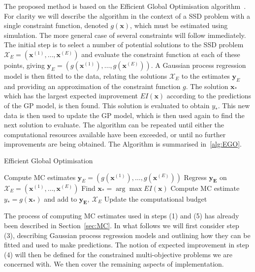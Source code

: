 \documentclass{article} %
\begin{document}
The proposed method is based on the Efficient Global Optimisation algorithm~\cite{Jones1998}. For clarity we will describe the algorithm in the context of a SSD problem with a single constraint function, denoted $g(\mathbf{x})$, which must be estimated using simulation. The more general case of several constraints will follow immediately. The initial step is to select a number of potential solutions to the SSD problem $\mathcal{X}_{E} = (\mathbf{x}^{(1)}, \ldots , \mathbf{x}^{(E)})$ and evaluate the constraint function at each of these points, giving $\mathbf{y}_{E} = (g(\mathbf{x}^{(1)}), \ldots , g(\mathbf{x}^{(E)}))$. A Gaussian process regression model is then fitted to the data, relating the solutions $\mathcal{X}_{E}$ to the estimates $\mathbf{y}_{E}$ and providing an approximation of the constraint function $g$. The solution $\mathbf{x}_{*}$ which has the largest expected improvement $EI(\mathbf{x})$ according to the predictions of the GP model, is then found. This solution is evaluated to obtain $y_*$. This new data is then used to update the GP model, which is then used again to find the next solution to evaluate. The algorithm can be repeated until either the computational resources available have been exceeded, or until no further improvements are being obtained. The Algorithm is summarised in~\ref{alg:EGO}.

\begin{algorithm}
\caption{Efficient Global Optimisation~\cite{Jones1998}}\label{alg:EGO}
\begin{algorithmic}[1]
\State Compute MC estimates $\mathbf{y}_{E} = (g(\mathbf{x}^{(1)}), \ldots , g(\mathbf{x}^{(E)}))$
\State Regress $\mathbf{y_{E}}$ on $\mathcal{X}_{E} = (\mathbf{x}^{(1)}, \ldots , \mathbf{x}^{(E)})$
\State Find $\mathbf{x}_{*} = \arg\max EI(\mathbf{x})$
\State Compute MC estimate $y_{*} = g(\mathbf{x}_{*})$ and add to $\mathbf{y_{E}},~\mathcal{X}_{E}$
\State Update the computational budget
\EndWhile
\end{algorithmic}
\end{algorithm}

The process of computing MC estimates used in steps (1) and (5) has already been described in Section~\ref{sec:MC}. In what follows we will first consider step (3), describing Gaussian process regression models and outlining how they can be fitted and used to make predictions. The notion of expected improvement in step (4) will then be defined for the constrained multi-objective problems we are concerned with. We then cover the remaining aspects of implementation.
\end{document}
